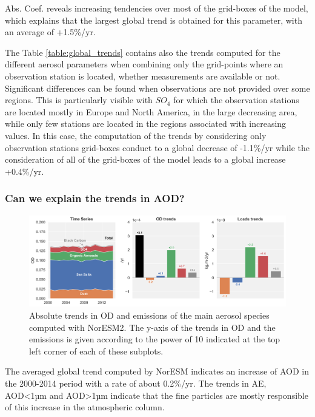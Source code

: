 \documentclass[journal abbreviation, manuscript]{copernicus}
\begin{document}
Abs. Coef. reveals increasing tendencies over most of the grid-boxes of the model, which explains that the largest global trend is obtained for this parameter, with an average of +1.5\%/yr.

The Table \ref{table:global_trends} contains also the trends computed for the different aerosol parameters when combining only the grid-points where an observation station is located, whether measurements are available or not. Significant differences can be found when observations are not provided over some regions. This is particularly visible with $SO_{4}$ for which the observation stations are located mostly in Europe and North America, in the large decreasing area, while only few stations are located in the regions associated with increasing values. In this case, the computation of the trends by considering only observation stations grid-boxes conduct to a global decrease of -1.1\%/yr while the consideration of all of the grid-boxes of the model leads to a global increase +0.4\%/yr.


\subsubsection{Can we explain the trends in AOD?}

\begin{figure}[t]
 \includegraphics[width=16cm]{../scripts/figs/abs_species_trends.png}
 \caption{Absolute trends in OD and emissions of the main aerosol species computed with NorESM2. The y-axis of the trends in OD and the emissions is given according to the power of 10 indicated at the top left corner of each of these subplots.}
 \label{fig:species}
\end{figure}

The averaged global trend computed by NorESM indicates an increase of AOD in the 2000-2014 period with a rate of about 0.2\%/yr. The trends in AE, AOD<1µm and AOD>1µm indicate that the fine particles are mostly responsible of this increase in the atmospheric column.
\end{document}
